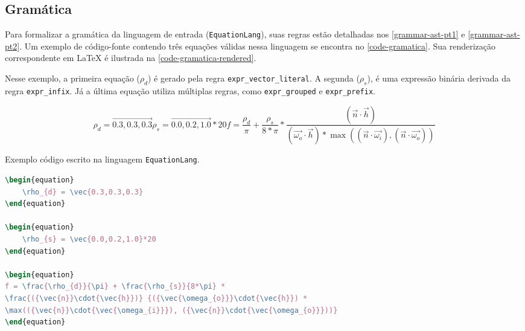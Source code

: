 \subsection{Gramática} \label{subsection-grammar}


Para formalizar a gramática da linguagem de entrada (\texttt{EquationLang}), suas regras estão detalhadas nos \autoref{grammar-ast-pt1} e \autoref{grammar-ast-pt2}. Um exemplo de código-fonte contendo três equações válidas nessa linguagem se encontra no \autoref{code-gramatica}. Sua renderização correspondente em \LaTeX{} é ilustrada na \autoref{code-gramatica-rendered}.

Nesse exemplo, a primeira equação ($\rho_{d}$) é gerado pela regra \verb"expr_vector_literal". A segunda ($\rho_{s}$), é uma expressão binária derivada da regra \verb"expr_infix". Já a última equação utiliza múltiplas regras, como \verb"expr_grouped" e \verb"expr_prefix".


\begin{subequations}
\label{code-gramatica-rendered} 
\begin{equation}
    \rho_{d} = \vec{0.3,0.3,0.3}
\end{equation}
\begin{equation}
    \rho_{s} = \vec{0.0,0.2,1.0} * 20
\end{equation}
\begin{equation}
f = \frac{\rho_{d}}{\pi} + \frac{\rho_{s}}{8*\pi} * \frac{({\vec{n}}\cdot{\vec{h}})} {({\vec{\omega_{o}}}\cdot{\vec{h}}) * \max(({\vec{n}}\cdot{\vec{\omega_{i}}}), ({\vec{n}}\cdot{\vec{\omega_{o}}}))}
\end{equation}
\end{subequations}


\begin{codigo}[htb]
        \caption{\small Exemplo código escrito na linguagem \texttt{EquationLang}. }
        \label{code-gramatica}
\begin{lstlisting}[language=tex, frame=none]
\begin{equation}
    \rho_{d} = \vec{0.3,0.3,0.3}
\end{equation}

\begin{equation}
    \rho_{s} = \vec{0.0,0.2,1.0}*20
\end{equation}

\begin{equation}
f = \frac{\rho_{d}}{\pi} + \frac{\rho_{s}}{8*\pi} *
\frac{({\vec{n}}\cdot{\vec{h}})} {({\vec{\omega_{o}}}\cdot{\vec{h}}) *
\max(({\vec{n}}\cdot{\vec{\omega_{i}}}), ({\vec{n}}\cdot{\vec{\omega_{o}}}))}
\end{equation}

\end{lstlisting}
\end{codigo}

